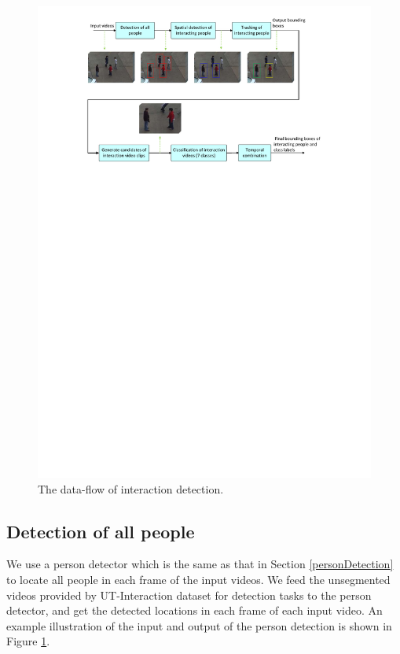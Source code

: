 \begin{figure}
	\includegraphics[trim=2cm 19.5cm 0cm 1cm]{fig01/interaction_detection.pdf}
	\caption{The data-flow of interaction detection.}
	\label{fig:interaction_detection}
\end{figure}

\subsection{Detection of all people}
We use a person detector which is the same as that in Section \ref{personDetection} to locate all people in each frame of the input videos. We feed the unsegmented videos provided by UT-Interaction dataset for detection tasks to the person detector, and get the detected locations in each frame of each input video. An example illustration of the input and output of the person detection is shown in Figure \ref{fig:interaction_detection}.

